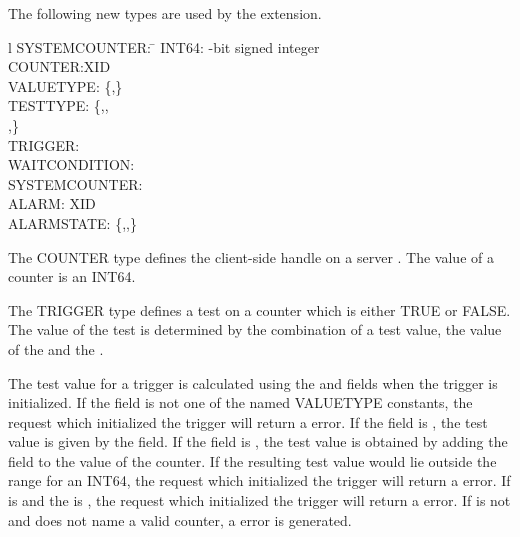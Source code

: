 The following new types are used by the extension.

\begin{tabbing}{l}
SYSTEMCOUNTER: \=\kill
	INT64:	-bit signed integer\\
	COUNTER:\>XID\\
  	VALUETYPE:\>  \{,\}\\
 	TESTTYPE:\> \{,,\\
		\>,\}\\
	TRIGGER:\\
	WAITCONDITION:\\
	SYSTEMCOUNTER:\\
	ALARM:	\>XID\\
	ALARMSTATE:\> \{,,\}\\
\end{tabbing}

The COUNTER type defines the client-side handle on a server .
The value of a counter is an INT64.

The TRIGGER type defines a test on a counter which is either TRUE or FALSE.
The value of the test is determined by the combination of a test value, the
value of the  and the .

The test value for a trigger is calculated using the  and
 fields when the trigger is initialized. 
If the  field is not one of the 
named VALUETYPE constants, the request which initialized the trigger
will return a  error. If the
 field is , the test value is given by the
 field. If the  field is
, the test value is obtained by adding the
 field to the value of the counter.  If the
resulting test value would lie outside the range for an INT64, the
request which initialized the trigger will return a
 error. If  is  and the
 is , the request which initialized the 
trigger will return a  error. 
If  is not  and does not name a valid
counter, a  error is generated.

